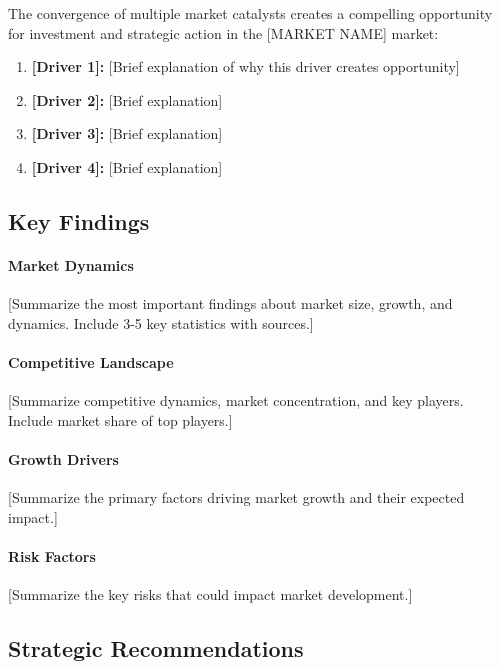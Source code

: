 \documentclass[11pt,letterpaper]{report}
\newcommand{\reporttitle}{[MARKET NAME]}
\begin{document}
The convergence of multiple market catalysts creates a compelling opportunity for investment and strategic action in the \reporttitle{} market:

\begin{keyinsightbox}
\begin{enumerate}
    \item \textbf{[Driver 1]:} [Brief explanation of why this driver creates opportunity]
    \item \textbf{[Driver 2]:} [Brief explanation]
    \item \textbf{[Driver 3]:} [Brief explanation]
    \item \textbf{[Driver 4]:} [Brief explanation]
\end{enumerate}
\end{keyinsightbox}

\subsection{Key Findings}

\paragraph{Market Dynamics}
[Summarize the most important findings about market size, growth, and dynamics. Include 3-5 key statistics with sources.]

\paragraph{Competitive Landscape}
[Summarize competitive dynamics, market concentration, and key players. Include market share of top players.]

\paragraph{Growth Drivers}
[Summarize the primary factors driving market growth and their expected impact.]

\paragraph{Risk Factors}
[Summarize the key risks that could impact market development.]

\subsection{Strategic Recommendations}
\end{document}
